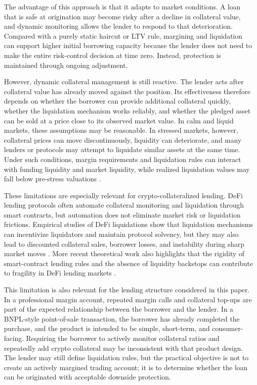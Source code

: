 \documentclass[11pt]{article}
\begin{document}
The advantage of this approach is that it adapts to market conditions. A loan that is safe at origination may become risky after a decline in collateral value, and dynamic monitoring allows the lender to respond to that deterioration. Compared with a purely static haircut or LTV rule, margining and liquidation can support higher initial borrowing capacity because the lender does not need to make the entire risk-control decision at time zero. Instead, protection is maintained through ongoing adjustment.

However, dynamic collateral management is still reactive. The lender acts after collateral value has already moved against the position. Its effectiveness therefore depends on whether the borrower can provide additional collateral quickly, whether the liquidation mechanism works reliably, and whether the pledged asset can be sold at a price close to its observed market value. In calm and liquid markets, these assumptions may be reasonable. In stressed markets, however, collateral prices can move discontinuously, liquidity can deteriorate, and many lenders or protocols may attempt to liquidate similar assets at the same time. Under such conditions, margin requirements and liquidation rules can interact with funding liquidity and market liquidity, while realized liquidation values may fall below pre-stress valuations \citep{brunnermeier_pedersen_2009_liquidity, shleifer_vishny_1992_liquidation}.

These limitations are especially relevant for crypto-collateralized lending. DeFi lending protocols often automate collateral monitoring and liquidation through smart contracts, but automation does not eliminate market risk or liquidation frictions. Empirical studies of DeFi liquidations show that liquidation mechanisms can incentivize liquidators and maintain protocol solvency, but they may also lead to discounted collateral sales, borrower losses, and instability during sharp market moves \citep{qin_2021_defi_liquidations}. More recent theoretical work also highlights that the rigidity of smart-contract lending rules and the absence of liquidity backstops can contribute to fragility in DeFi lending markets \citep{chiu_2023_defi_fragility}.

This limitation is also relevant for the lending structure considered in this paper. In a professional margin account, repeated margin calls and collateral top-ups are part of the expected relationship between the borrower and the lender. In a BNPL-style point-of-sale transaction, the borrower has already completed the purchase, and the product is intended to be simple, short-term, and consumer-facing. Requiring the borrower to actively monitor collateral ratios and repeatedly add crypto collateral may be inconsistent with that product design. The lender may still define liquidation rules, but the practical objective is not to create an actively margined trading account; it is to determine whether the loan can be originated with acceptable downside protection.
\end{document}
